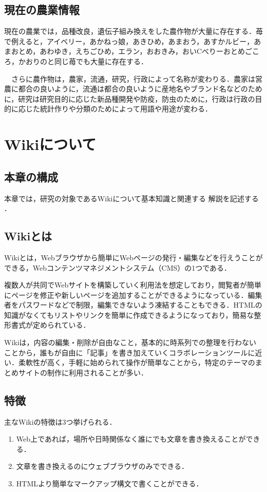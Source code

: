 \section{現在の農業情報}
現在の農業では，品種改良，遺伝子組み換えをした農作物が大量に存在する．苺で例えると，アイベリー，あかねっ娘，あきひめ，あまおう，あすかルビー，あまおとめ，あわゆき，えちごひめ，エラン，おおきみ，おいCべりーおとめごころ，かおりのと同じ苺でも大量に存在する．

　さらに農作物は，農家，流通，研究，行政によって名称が変わりる．農家は営農に都合の良いように，流通は都合の良いように産地名やブランド名などのために，研究は研究目的に応じた新品種開発や防疫，防虫のために，行政は行政の目的に応じた統計作りや分類のためによって用語や用途が変わる．

\chapter{Wikiについて}
\section{本章の構成}
本章では，研究の対象であるWikiについて基本知識と関連する 解説を記述する ．
\section{Wikiとは}
Wikiとは，Webブラウザから簡単にWebページの発行・編集などを行えうことができる，Webコンテンツマネジメントシステム（CMS）の1つである．

複数人が共同でWebサイトを構築していく利用法を想定しており，閲覧者が簡単にページを修正や新しいページを追加することができるようになっている．編集者をパスワードなどで制限，編集できないよう凍結することもできる．HTMLの知識がなくてもリストやリンクを簡単に作成できるようになっており，簡易な整形書式が定められている．

Wikiは，内容の編集・削除が自由なこと，基本的に時系列での整理を行わないことから，誰もが自由に「記事」を書き加えていくコラボレーションツールに近い．柔軟性が高く，手軽に始められて操作が簡単なことから，特定のテーマのまとめサイトの制作に利用されることが多い．\cite{wiki}
\section{特徴}
主なWikiの特徴は3つ挙げられる．\cite{wiki3}
\begin{enumerate}
\item Web上であれば，場所や日時関係なく誰にでも文章を書き換えることができる．
\item 文章を書き換えるのにウェブブラウザのみでできる．
\item HTMLより簡単なマークアップ構文で書くことができる．
\end{enumerate}
